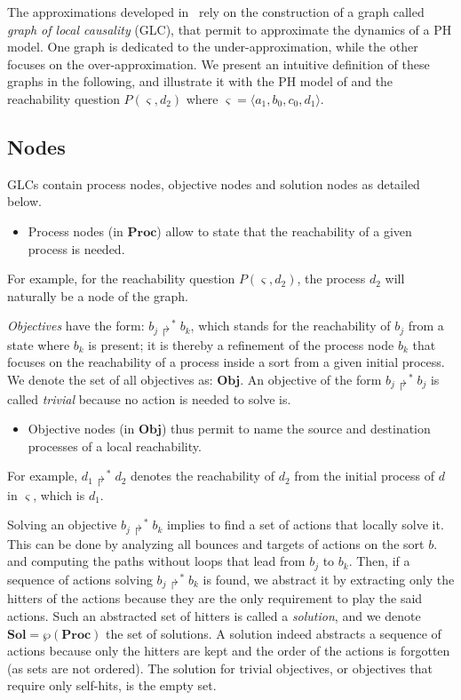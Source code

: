 \documentclass{movep}
\def\pref{\prettyref}
\newcommand{\Proc}{\mathbf{Proc}}
\newcommand{\powerset}{\wp}
\newcommand{\PHfrappeB}{\Rsh}
\newcommand{\PHobjectif}[2]{\mbox{$#1\PHfrappeB^*\!#2$}}
\newcommand{\PHobj}{\PHobjectif}
\def\Obj{\mathbf{Obj}}
\def\ctx{\varsigma}
\newcommand{\Sol}{\mathbf{Sol}}
\newcommand{\Pcai}{P(\ctx, a_i)}
\newcommand{\PHetat}[1]{\mbox{$\langle #1 \rangle$}}
\def\ctx{\varsigma}
\newcounter{la}
\newcommand{\ie}{i.e.\ }
\begin{document}
The approximations developed in~\cite{PMR12-MSCS,FPMR13-CS2Bio}
rely on the construction of a graph called
\emph{graph of local causality} (GLC),
that permit to approximate the dynamics of a PH model.
One graph is dedicated to the under-approximation, while the other focuses on the over-approximation.
We present an intuitive definition of these graphs in the following,
and illustrate it with the PH model of \pref{fig:ph} and
the reachability question $P(\ctx, d_2)$ where $\ctx = \PHetat{a_1,b_0,c_0,d_1}$.

\subsection{Nodes}

GLCs contain process nodes, objective nodes and solution nodes as detailed below.

\begin{itemize}
  \item
Process nodes (in $\Proc$) allow to state that the reachability of a given process is needed.
\end{itemize}
For example, for the reachability question $P(\ctx, d_2)$, the process $d_2$ will naturally be a node
of the graph.

\emph{Objectives} have the form: $\PHobj{b_j}{b_k}$, which stands for the reachability
of $b_j$ from a state where $b_k$ is present;
it is thereby a refinement of the process node $b_k$ that focuses
on the reachability of a process inside a sort from a given initial process.
We denote the set of all objectives as: $\Obj$.
An objective of the form $\PHobj{b_j}{b_j}$ is called \emph{trivial}
because no action is needed to solve is.
\begin{itemize}
\item
Objective nodes (in $\Obj$) thus permit to name the source and destination processes of a local reachability.
\end{itemize}
For example, $\PHobj{d_1}{d_2}$ denotes the reachability of $d_2$ from
the initial process of $d$ in $\ctx$, which is $d_1$.

Solving an objective $\PHobj{b_j}{b_k}$
implies to find a set of actions that locally solve it.
This can be done by analyzing all bounces and targets of actions on the sort $b$.
and computing the paths without loops that lead from $b_j$ to $b_k$.
Then, if a sequence of actions solving $\PHobj{b_j}{b_k}$ is found,
we abstract it by extracting only the hitters of the actions
because they are the only requirement to play the said actions.
Such an abstracted set of hitters is called a \emph{solution},
and we denote $\Sol = \powerset(\Proc)$ the set of solutions.
A solution indeed abstracts a sequence of actions because only the hitters are kept
and the order of the actions is forgotten (as sets are not ordered).
The solution for trivial objectives,
or objectives that require only self-hits, is the empty set.
\end{document}
